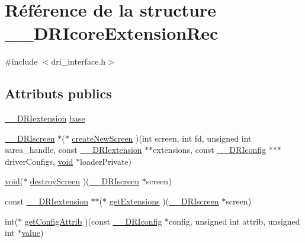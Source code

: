\hypertarget{struct_____d_r_icore_extension_rec}{\section{Référence de la structure \-\_\-\-\_\-\-D\-R\-Icore\-Extension\-Rec}
\label{struct_____d_r_icore_extension_rec}
}


{\ttfamily \#include $<$dri\-\_\-interface.\-h$>$}

\subsection*{Attributs publics}
\begin{DoxyCompactItemize}
\item 
\hyperlink{dri__interface_8h_a4e0a61c8ece00d2b2c6792a9a1b55385}{\-\_\-\-\_\-\-D\-R\-Iextension} \hyperlink{struct_____d_r_icore_extension_rec_a5f960f7c4747dbda8574a66c246f2cc0}{base}
\item 
\hyperlink{dri__interface_8h_a9961b01d421ee1fd6ed3c05acc9ca561}{\-\_\-\-\_\-\-D\-R\-Iscreen} $\ast$($\ast$ \hyperlink{struct_____d_r_icore_extension_rec_a03d777e65a01236f2fe86dcbe64947bc}{create\-New\-Screen} )(int screen, int fd, unsigned int sarea\-\_\-handle, const \hyperlink{dri__interface_8h_a4e0a61c8ece00d2b2c6792a9a1b55385}{\-\_\-\-\_\-\-D\-R\-Iextension} $\ast$$\ast$extensions, const \hyperlink{dri__interface_8h_aeac81999efbbf8b1d6886338e3ea24d9}{\-\_\-\-\_\-\-D\-R\-Iconfig} $\ast$$\ast$$\ast$driver\-Configs, \hyperlink{glu_8h_a4292190e3f1f6b373a760c7d9316ad3c}{void} $\ast$loader\-Private)
\item 
\hyperlink{glu_8h_a4292190e3f1f6b373a760c7d9316ad3c}{void}($\ast$ \hyperlink{struct_____d_r_icore_extension_rec_a883e228e8f452c7939a63107ef17326a}{destroy\-Screen} )(\hyperlink{dri__interface_8h_a9961b01d421ee1fd6ed3c05acc9ca561}{\-\_\-\-\_\-\-D\-R\-Iscreen} $\ast$screen)
\item 
const \hyperlink{dri__interface_8h_a4e0a61c8ece00d2b2c6792a9a1b55385}{\-\_\-\-\_\-\-D\-R\-Iextension} $\ast$$\ast$($\ast$ \hyperlink{struct_____d_r_icore_extension_rec_adb2a7440735042ebec39fc388c5ccf8e}{get\-Extensions} )(\hyperlink{dri__interface_8h_a9961b01d421ee1fd6ed3c05acc9ca561}{\-\_\-\-\_\-\-D\-R\-Iscreen} $\ast$screen)
\item 
int($\ast$ \hyperlink{struct_____d_r_icore_extension_rec_ae6ce8717daa2354781534cf2b2a28e35}{get\-Config\-Attrib} )(const \hyperlink{dri__interface_8h_aeac81999efbbf8b1d6886338e3ea24d9}{\-\_\-\-\_\-\-D\-R\-Iconfig} $\ast$config, unsigned int attrib, unsigned int $\ast$\hyperlink{glext_8h_a79169be77d7e02a24f68a5bfe627dc29}{value})

\end{DoxyCompactItemize}
